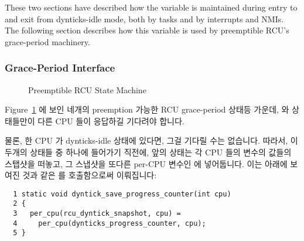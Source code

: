 These two sections have described how the
 variable is maintained during
entry to and exit from dynticks-idle mode, both by tasks and by
interrupts and NMIs.
The following section describes how this variable is used by
preemptible RCU's grace-period machinery.
\fi

\subsubsection{Grace-Period Interface}
\label{sec:formal:Grace-Period Interface}

\begin{figure}[htb]
\centering
{}
\caption{Preemptible RCU State Machine}
\label{fig:formal:Preemptible RCU State Machine}
\end{figure}

Figure~\ref{fig:formal:Preemptible RCU State Machine} 에 보인 네개의 preemption
가능한 RCU grace-period 상태등 가운데,  와
 상태들만이 다른 CPU 들이 응답하길 기다려야
합니다.

물론, 한 CPU 가 dynticks-idle 상태에 있다면, 그걸 기다릴 수는 없습니다.
따라서, 이 두개의 상태들 중 하나에 들어가기 직전에, 앞의 상태는 각 CPU 들의
 변수의 값들의 스탭샷을 떠놓고, 그 스냅샷을
또다른 per-CPU 변수인  에 넣어둡니다.
이는 아래에 보여진 것과 같은  를
호출함으로써 이뤄집니다:
\iffalse

Of the four preemptible RCU grace-period states shown in
Figure~\ref{fig:formal:Preemptible RCU State Machine},
only the \co{rcu_try_flip_waitack_state()}
and \co{rcu_try_flip_waitmb_state()} states need to wait
for other CPUs to respond.

Of course, if a given CPU is in dynticks-idle state, we shouldn't
wait for it.
Therefore, just before entering one of these two states,
the preceding state takes a snapshot of each CPU's
\co{dynticks_progress_counter} variable, placing the
snapshot in another per-CPU variable,
\co{rcu_dyntick_snapshot}.
This is accomplished by invoking
\co{dyntick_save_progress_counter()}, shown below:
\fi

{ \scriptsize
\begin{verbatim}
  1 static void dyntick_save_progress_counter(int cpu)
  2 {
  3   per_cpu(rcu_dyntick_snapshot, cpu) =
  4     per_cpu(dynticks_progress_counter, cpu);
  5 }
\end{verbatim}
}

